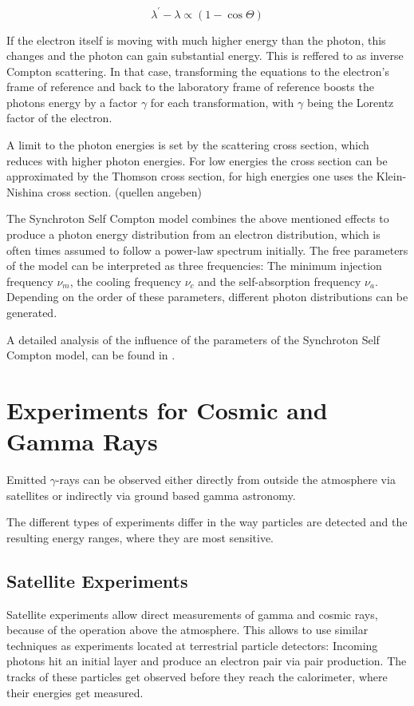 \begin{equation}
	\lambda^{\prime} - \lambda  \propto \left(1-\cos{\Theta} \right)
	\label{eq:compton}
\end{equation}

If the electron itself is moving with much higher energy
than the photon, this changes and the photon can gain substantial energy.
This is reffered to as inverse Compton scattering.
In that case, transforming the equations to the 
electron's frame of reference and back to the laboratory frame of reference
boosts the photons energy by a factor $\gamma$ for each transformation, 
with $\gamma$ being the Lorentz factor of the electron.

A limit to the photon energies is set by the scattering cross
section, which reduces with higher photon energies.
For low energies the cross section can be approximated by 
the Thomson cross section, for high energies
one uses the Klein-Nishina cross section. (quellen angeben)

The Synchroton Self Compton model combines the above mentioned
effects to produce a photon energy distribution from an
electron distribution, which is often times assumed to
follow a power-law spectrum initially.
The free parameters of the model can be interpreted as 
three frequencies: The minimum injection frequency $\nu_m$, 
the cooling frequency $\nu_c$ and the self-absorption frequency $\nu_a$.
Depending on the order of these parameters, different 
photon distributions can be generated.

A detailed analysis of the influence of the parameters of
the Synchroton Self Compton model, can be found in 
\cite{10.1093/mnras/stt1461}.


\section{Experiments for Cosmic and Gamma Rays}
Emitted $\gamma$-rays can be observed either directly
from outside the atmosphere via satellites or indirectly
via ground based gamma astronomy.

The different types of experiments differ in the way particles are detected and
the resulting energy ranges, where they are most sensitive.

\subsection{Satellite Experiments}
Satellite experiments allow direct measurements of gamma and cosmic rays, because of the operation
above the atmosphere.
This allows to use similar techniques as experiments located at terrestrial 
particle detectors: Incoming photons hit an initial layer and produce an electron pair 
via pair production. The tracks of these particles get observed before they reach the calorimeter,
where their energies get measured.

